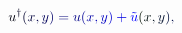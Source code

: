 \documentclass[12pt]{article}
\begin{document}
\makeatletter
\renewcommand*{\@textcolor}[3]{%
  \protect\leavevmode
  \begingroup
    \color#1{#2}#3%
  \endgroup
}
\makeatother
\begin{displaymath}
\begin{array} {r} \displaystyle { \mathcolor[RGB]{0,0,15}{u} ^ { \mathcolor[RGB]{0,0,30}{\dag} } \mathcolor[RGB]{0,0,45}{(} \mathcolor[RGB]{0,0,60}{x} \mathcolor[RGB]{0,0,75}{,} \mathcolor[RGB]{0,0,90}{y} \mathcolor[RGB]{0,0,105}{)} \mathcolor[RGB]{0,0,120}{=} \mathcolor[RGB]{0,0,135}{u} \mathcolor[RGB]{0,0,150}{(} \mathcolor[RGB]{0,0,165}{x} \mathcolor[RGB]{0,0,180}{,} \mathcolor[RGB]{0,0,195}{y} \mathcolor[RGB]{0,0,210}{)} \mathcolor[RGB]{0,0,225}{+} \mathcolor[RGB]{0,0,240}{\tilde { \mathcolor[RGB]{0,0,255}{u} } } \mathcolor[RGB]{0,15,0}{(} \mathcolor[RGB]{0,15,15}{x} \mathcolor[RGB]{0,15,30}{,} \mathcolor[RGB]{0,15,45}{y} \mathcolor[RGB]{0,15,60}{)} \mathcolor[RGB]{0,15,75}{,} } \end{array}
\end{displaymath}
\end{document}

